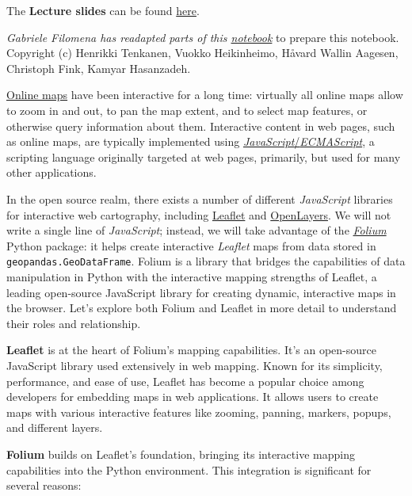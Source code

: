 \documentclass[
  letterpaper,
  DIV=11,
  numbers=noendperiod]{scrreprt}
\begin{document}
The \textbf{Lecture slides} can be found
\href{https://github.com/GDSL-UL/wma/raw/main/lectures/w05.html}{here}.

\emph{Gabriele Filomena has readapted parts of this
\href{https://autogis-site.readthedocs.io/en/latest/lessons/lesson-5/interactive-maps.html}{notebook}}
to prepare this notebook. Copyright (c) Henrikki Tenkanen, Vuokko
Heikinheimo, Håvard Wallin Aagesen, Christoph Fink, Kamyar Hasanzadeh.

\href{https://link.springer.com/referenceworkentry/10.1007/978-3-319-23519-6_1485-2}{Online
maps} have been interactive for a long time: virtually all online maps
allow to zoom in and out, to pan the map extent, and to select map
features, or otherwise query information about them. Interactive content
in web pages, such as online maps, are typically implemented using
\href{https://en.wikipedia.org/wiki/ECMAScript}{\emph{JavaScript}/\emph{ECMAScript}},
a scripting language originally targeted at web pages, primarily, but
used for many other applications.

In the open source realm, there exists a number of different
\emph{JavaScript} libraries for interactive web cartography, including
\href{https://leafletjs.com/}{Leaflet} and
\href{https://openlayers.org/}{OpenLayers}. We will not write a single
line of \emph{JavaScript}; instead, we will take advantage of the
\href{https://python-visualization.github.io/folium/}{\emph{Folium}}
Python package: it helps create interactive \emph{Leaflet} maps from
data stored in \texttt{geopandas.GeoDataFrame}. Folium is a library that
bridges the capabilities of data manipulation in Python with the
interactive mapping strengths of Leaflet, a leading open-source
JavaScript library for creating dynamic, interactive maps in the
browser. Let's explore both Folium and Leaflet in more detail to
understand their roles and relationship.

\textbf{Leaflet} is at the heart of Folium's mapping capabilities. It's
an open-source JavaScript library used extensively in web mapping. Known
for its simplicity, performance, and ease of use, Leaflet has become a
popular choice among developers for embedding maps in web applications.
It allows users to create maps with various interactive features like
zooming, panning, markers, popups, and different layers.

\textbf{Folium} builds on Leaflet's foundation, bringing its interactive
mapping capabilities into the Python environment. This integration is
significant for several reasons:
\end{document}
